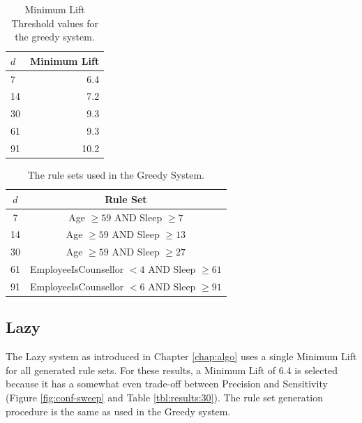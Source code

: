 \begin{table}[h]
	\centering

	\begin{tabular}{lr}
	\toprule
	{$d$} &  Minimum Lift \\
	\midrule
	7     & 6.4 \\
	14    & 7.2 \\
	30    & 9.3 \\
	61    & 9.3 \\
	91    & 10.2 \\

	\bottomrule
	\end{tabular}

	\caption{Minimum Lift Threshold values for the greedy system.}
	\label{tbl:results:mltgreedy}
\end{table}


\begin{table}[h]
	\centering

	\begin{tabular}{cc}
	\toprule
	$d$ & Rule Set \\
	\midrule
	7	& Age $\geq 59$ AND Sleep $\geq 7$ \\
	\midrule
	14	& Age $\geq 59$ AND Sleep $\geq 13$ \\
	\midrule
	30	& Age $\geq 59$ AND Sleep $\geq 27$ \\
	\midrule
	61	& EmployeeIsCounsellor $< 4$ AND Sleep $\geq 61$ \\
	\midrule
	91	& EmployeeIsCounsellor $< 6$ AND Sleep $\geq 91$ \\

	\bottomrule
	\end{tabular}

	\caption{The rule sets used in the Greedy System.}
	\label{tbl:results:greedysets}
\end{table}



\subsection{Lazy}

The Lazy system as introduced in Chapter \ref{chap:algo} uses a single Minimum Lift for all generated rule sets. For these results, a Minimum Lift of 6.4 is selected because it has a somewhat even trade-off between Precision and Sensitivity (Figure \ref{fig:conf-sweep} and Table \ref{tbl:results:30}). The rule set generation procedure is the same as used in the Greedy system.

